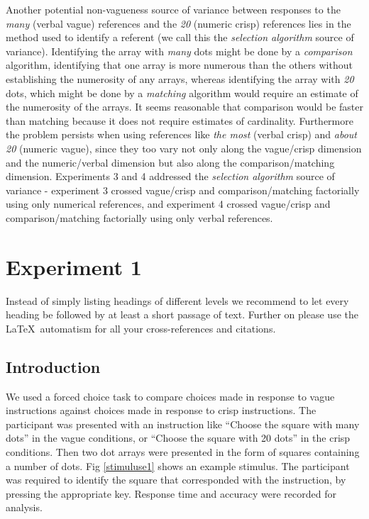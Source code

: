 \documentclass[graybox,envcountchap,sectrefs%
,footinfo
]{svmono}
\begin{document}
Another potential non-vagueness source of variance between responses to the \emph{many} (verbal vague) references and the \emph{20} (numeric crisp) references lies in the method used to identify a referent (we call this the {\sl selection algorithm} source of variance). Identifying the array with \emph{many} dots might be done by a \emph{comparison} algorithm, identifying that one array is more numerous than the others without establishing the numerosity of any arrays, whereas identifying the array with \emph{20} dots, which might be done by a \emph{matching} algorithm would require an estimate of the numerosity of the arrays. It seems reasonable that comparison would be faster than matching because it does not require estimates of cardinality. Furthermore the problem persists when using references like \emph{the most} (verbal crisp) and \emph{about 20} (numeric vague), since they too vary not only along the vague/crisp dimension and the numeric/verbal dimension but also along the comparison/matching dimension. Experiments 3 and 4 addressed the \emph{selection algorithm} source of variance - experiment 3 crossed vague/crisp and comparison/matching factorially using only numerical references, and experiment 4 crossed vague/crisp and comparison/matching factorially using only verbal references.  

\section{Experiment 1}
\label{sec:2}
Instead of simply listing headings of different levels we recommend to let every heading be followed by at least a short passage of text. Further on please use the \LaTeX\ automatism for all your cross-references and citations.

\subsection{Introduction}%
We used a forced choice task to compare choices made in response to vague instructions against choices made in response to crisp instructions. The participant was presented with an instruction like ``Choose the square with many dots'' in the vague conditions, or ``Choose the square with 20 dots'' in the crisp conditions. Then two dot arrays were presented in the form of squares containing a number of dots. Fig \ref{stimuluse1} shows an example stimulus. The participant was required to identify the square that corresponded with the instruction, by pressing the appropriate key.
Response time and accuracy were recorded for analysis. 
\end{document}
